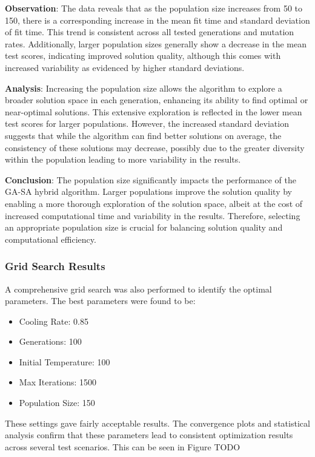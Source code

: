 \documentclass{article}
\begin{document}
    \textbf{Observation}: The data reveals that as the population size increases from 50 to 150, there is a corresponding increase in the mean fit time and standard deviation of fit time. This trend is consistent across all tested generations and mutation rates. Additionally, larger population sizes generally show a decrease in the mean test scores, indicating improved solution quality, although this comes with increased variability as evidenced by higher standard deviations.

    \textbf{Analysis}: Increasing the population size allows the algorithm to explore a broader solution space in each generation, enhancing its ability to find optimal or near-optimal solutions. This extensive exploration is reflected in the lower mean test scores for larger populations. However, the increased standard deviation suggests that while the algorithm can find better solutions on average, the consistency of these solutions may decrease, possibly due to the greater diversity within the population leading to more variability in the results.

    \textbf{Conclusion}: The population size significantly impacts the performance of the GA-SA hybrid algorithm. Larger populations improve the solution quality by enabling a more thorough exploration of the solution space, albeit at the cost of increased computational time and variability in the results. Therefore, selecting an appropriate population size is crucial for balancing solution quality and computational efficiency.

    \subsubsection{Grid Search Results}
    A comprehensive grid search was also performed to identify the optimal parameters.
    The best parameters were found to be:
    \begin{itemize}
        \item Cooling Rate: 0.85
        \item Generations: 100
        \item Initial Temperature: 100
        \item Max Iterations: 1500
        \item Population Size: 150
    \end{itemize}
    These settings gave fairly acceptable results. The convergence plots and statistical analysis confirm that these parameters lead to consistent optimization results across several test scenarios. This can be seen in Figure TODO
\end{document}
